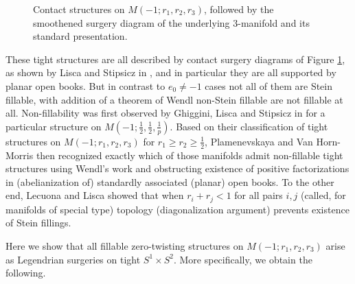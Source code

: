 \documentclass{amsart}
\theoremstyle{definition}
\begin{document}
\begin{figure}[H]
\caption{Contact structures on $M(-1;r_1,r_2,r_3)$, followed by the smoothened surgery diagram of the underlying $3$-manifold and its standard presentation.}
\label{fig:SFS}
\end{figure}

These tight structures are all described by contact surgery diagrams of Figure \ref{fig:SFS}, as shown by Lisca and Stipsicz in \cite{LS.III}, and in particular they are all supported by planar open books. But in contrast to $e_0\neq -1$ cases not all of them are Stein fillable, with addition of a theorem of Wendl \cite{W} non-Stein fillable are not fillable at all. Non-fillability was first observed by Ghiggini, Lisca and Stipsicz in \cite{GLS} for a particular structure on $M(-1;\frac{1}{2},\frac{1}{2},\frac{1}{p})$. Based on their classification \cite{GLS} of tight structures on $M(-1;r_1,r_2,r_3)$ for $r_1\geq r_2\geq\frac{1}{2}$, Plamenevskaya and Van Horn-Morris \cite{PVH-M} then recognized exactly which of those manifolds admit non-fillable tight structures using Wendl's work and obstructing existence of positive factorizations in (abelianization of) standardly associated (planar) open books. To the other end, Lecuona and Lisca \cite{LL} showed that when $r_i+r_j<1$ for all pairs $i,j$ (called, for manifolds of special type) topology (diagonalization argument) prevents existence of Stein fillings.

Here we show that all fillable zero-twisting structures on $M(-1;r_1,r_2,r_3)$ arise as Legendrian surgeries on tight $S^1\times S^2$. More specifically, we obtain the following.
\end{document}
